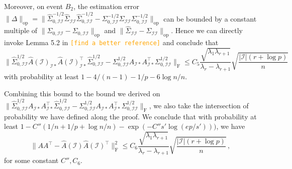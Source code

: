 \documentclass[11pt]{article}
\newcommand{\nb}[1]{\textcolor{orange}{\texttt{[#1]}}}
\newcommand{\ha}{\widehat{A}}
\newcommand{\AI}{\widehat{A}(\cI)}
\newcommand{\cI}{{\mathcal{I}}}
\newcommand{\0}{{\mathbf{0}}}
\newcommand{\op}{{\mathrm{op}}}
\begin{document}
 \fi
Moreover, on event $B_2$, the estimation error $\|\Delta\|_\op = \|\widehat{\Sigma}_{0,\cI\cI}^{-1/2}\widehat{\Sigma}_{\cI\cI}\widehat{\Sigma}_{0,\cI\cI}^{-1/2}-\Sigma_{0,\cI\cI}^{-1/2}\Sigma_{\cI\cI}\Sigma_{0,\cI\cI}^{-1/2}\|_\op$ can be bounded by a constant multiple of $\|\widehat{\Sigma}_{0,\cI\cI}-\Sigma_{0,\cI\cI}\|_\op$ and $\|\widehat{\Sigma}_{\cI\cI}-\Sigma_{\cI\cI}\|_\op$. 
Hence we can directly invoke Lemma 5.2 in \cite{wang2014tighten} 
\nb{find a better reference}
and conclude that
\begin{equation*}
     \|\widehat{\Sigma}_{0,\cI\cI}^{1/2}\AI_{\cI*}\AI^\top  _{\cI*}\widehat{\Sigma}_{0,\cI\cI}^{1/2}-\Sigma_{0,\cI\cI}^{1/2}A_{\cI*}A^\top  _{\cI*}\Sigma_{0,\cI\cI}^{1/2}\|_\mathrm{F}\leq C_5\frac{\sqrt{\lambda_1\lambda_{r+1}}}{\lambda_r-\lambda_{r+1}}\sqrt{\frac{|\cI|(r+\log p)}{n}}
\end{equation*}
with probability at least $1-4/(n-1)-1/p-6\log n/n.$
 
Combining this bound to the bound we derived on $\|\widehat{\Sigma}_{0,\cI\cI}^{1/2}A_{\cI*}A^\top  _{\cI*}\widehat{\Sigma}_{0,\cI\cI}^{1/2}-\Sigma_{0,\cI\cI}^{1/2}A_{\cI*}A^\top  _{\cI*}\Sigma_{0,\cI\cI}^{1/2}\|_\mathrm{F}$, we also take the intersection of probability we have defined along the proof. We conclude that with probability at least $1-C''(1/n+1/p+\log n/n)-\exp(-C''s'\log(ep/s')))$, we have \begin{equation*}
\|AA^\top-\ha(\cI)\ha(\cI)^\top\|_\mathrm{F}^2\leq C_6\frac{\sqrt{\lambda_1\lambda_{r+1}}}{\lambda_r-\lambda_{r+1}}\sqrt{\frac{|\cI|(r+\log p)}{n}}\,,
\end{equation*}
for some constant $C'', C_6.$ 
\end{document}
